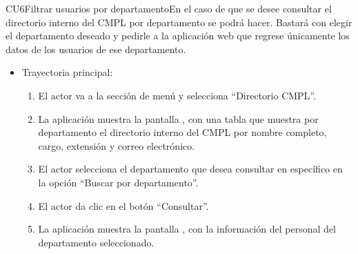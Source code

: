 \newpage
\begin{UseCase}{CU6}{Filtrar usuarios por departamento}{En el caso de que se desee consultar el directorio interno del CMPL por departamento se podrá hacer. Bastará con elegir el departamento deseado y pedirle a la aplicación web que regrese únicamente los datos de los usuarios de ese departamento.}
	\end{UseCase}
			
			\begin{itemize}
				\item Trayectoria principal:
					\begin{enumerate}
						\item El actor va a la sección de menú y selecciona ``Directorio CMPL''.
						\item La aplicación muestra la pantalla , con una tabla que muestra por departamento el directorio interno del CMPL por nombre completo, cargo, extensión y correo electrónico.
						\item El actor selecciona el departamento que desea consultar en específico en la opción ``Buscar por departamento''.
						\item El actor da clic en el botón ``Consultar''.
						\item La aplicación muestra la pantalla , con la información del personal del departamento seleccionado. 
					\end{enumerate}
			\end{itemize}
			
\newpage

